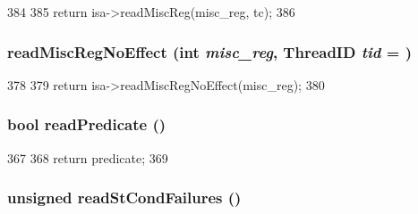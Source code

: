 \begin{DoxyCode}
384     {
385         return isa->readMiscReg(misc_reg, tc);
386     }
\end{DoxyCode}
\hypertarget{classSimpleThread_af2ec8925148a53b9bddefb7fb65a7223}{
\subsubsection[{readMiscRegNoEffect}]{ readMiscRegNoEffect (int {\em misc\_\-reg}, \/  {\bf ThreadID} {\em tid} = {})}}
\label{classSimpleThread_af2ec8925148a53b9bddefb7fb65a7223}



\begin{DoxyCode}
378     {
379         return isa->readMiscRegNoEffect(misc_reg);
380     }
\end{DoxyCode}
\hypertarget{classSimpleThread_a254cecc48d457ea298b08a8bb009f9cf}{
\subsubsection[{readPredicate}]{\setlength{\rightskip}{0pt plus 5cm}bool readPredicate ()}}
\label{classSimpleThread_a254cecc48d457ea298b08a8bb009f9cf}



\begin{DoxyCode}
367     {
368         return predicate;
369     }
\end{DoxyCode}
\hypertarget{classSimpleThread_a25b995a791e41965e088d8bf3f2bf859}{
\subsubsection[{readStCondFailures}]{\setlength{\rightskip}{0pt plus 5cm}unsigned readStCondFailures ()}}
\label{classSimpleThread_a25b995a791e41965e088d8bf3f2bf859}



